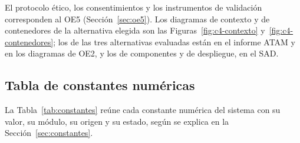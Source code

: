 El protocolo ético, los consentimientos y los instrumentos de validación corresponden al OE5
(Sección~\ref{sec:oe5}). Los diagramas de contexto y de contenedores
de la alternativa elegida son las Figuras~\ref{fig:c4-contexto} y~\ref{fig:c4-contenedores};
los de las tres alternativas evaluadas están en el informe ATAM y en los diagramas de OE2, y
los de componentes y de despliegue, en el SAD.

\subsection{Tabla de constantes numéricas}
\label{anx:constantes}

La Tabla~\ref{tab:constantes} reúne cada constante numérica del sistema con su valor, su módulo, su origen y su estado, según se explica en la Sección~\ref{sec:constantes}.

